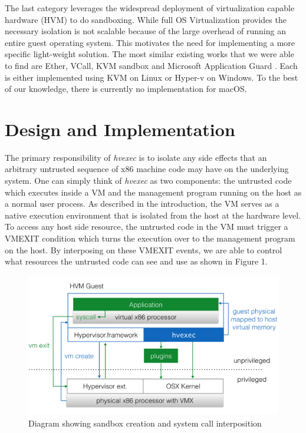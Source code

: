 \documentclass{article}
\newcommand{\PROJNAME}{\textit{hvexec}}
\begin{document}
The last category leverages the widespread deployment of virtualization capable hardware (HVM) to do sandboxing.
While full OS Virtualization provides the necessary isolation is not scalable because of the large overhead of running an entire guest operating system.
This motivates the need for implementing a more specific light-weight solution.
The most similar existing works that we were able to find are Ether, VCall, KVM sandbox and Microsoft Application Guard \cite{Ether2008, Ayer2012, VCall2010, msft2016}.
Each is either implemented using KVM on Linux or Hyper-v on Windows.
To the best of our knowledge, there is currently no implementation for macOS.

\section{Design and Implementation}
The primary responsibility of \PROJNAME{} is to isolate any side effects that an arbitrary untrusted sequence of x86 machine code may have on the underlying system.
One can simply think of \PROJNAME{} as two components: the untrusted code which executes inside a VM and the management program running on the host as a normal user process.
As described in the introduction, the VM serves as a native execution environment that is isolated from the host at the hardware level.
To access any host side resource, the untrusted code in the VM must trigger a VMEXIT condition which turns the execution over to the management program on the host.
By interposing on these VMEXIT events, we are able to control what resources the untrusted code can see and use as shown in Figure 1.

\begin{figure}[ht]
    \includegraphics[width=16cm]{hvm}
    \caption{Diagram showing sandbox creation and system call interposition}
    \centering
\end{figure}
\end{document}
